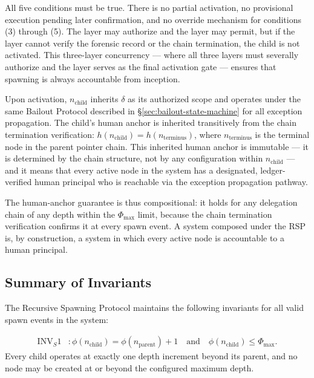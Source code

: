 {{All five conditions must be true. There is no partial activation, no provisional execution pending later confirmation, and no override mechanism for conditions (3) through (5). The \purpose{} layer may authorize and the \bounds{} layer may permit, but if the \fact{} layer cannot verify the forensic record or the chain termination, the child is not activated. This three-layer concurrency — where all three layers must severally authorize and the \fact{} layer serves as the final activation gate — ensures that spawning is always accountable from inception.

Upon activation, $n_{\text{child}}$ inherits $\delta$ as its authorized scope and operates under the same Bailout Protocol described in \S\ref{sec:bailout-state-machine} for all exception propagation. The child's human anchor is inherited transitively from the chain termination verification: $h(n_{\text{child}}) = h(n_{\text{terminus}})$, where $n_{\text{terminus}}$ is the terminal node in the parent pointer chain. This inherited human anchor is immutable — it is determined by the chain structure, not by any configuration within $n_{\text{child}}$ — and it means that every active node in the system has a designated, ledger-verified human principal who is reachable via the exception propagation pathway.

The human-anchor guarantee is thus compositional: it holds for any delegation chain of any depth within the $\Phi_{\max}$ limit, because the chain termination verification confirms it at every spawn event. A system composed under the RSP is, by construction, a system in which every active node is accountable to a human principal.

\subsection{Summary of Invariants}\label{sec:spawn-invariants}

The Recursive Spawning Protocol maintains the following invariants for all valid spawn events in the \bxthree{} system:

\begin{align}
\text{INV}_S1 &: \phi(n_{\text{child}}) = \phi(n_{\text{parent}}) + 1 \quad \text{and} \quad \phi(n_{\text{child}}) \leq \Phi_{\max}. \tag{INV-S1}
\end{align}
Every child operates at exactly one depth increment beyond its parent, and no node may be created at or beyond the configured maximum depth.

}}
